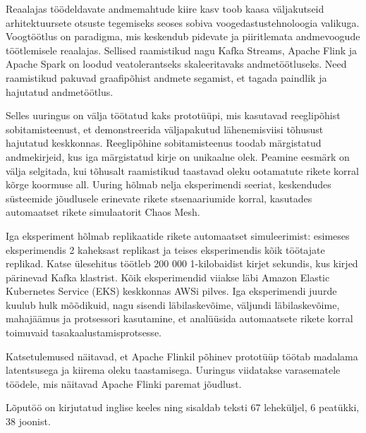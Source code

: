 Reaalajas töödeldavate andmemahtude kiire kasv toob kaasa
väljakutseid arhitektuursete otsuste tegemiseks seoses sobiva voogedastustehnoloogia valikuga.
Voogtöötlus on paradigma, mis keskendub pidevate ja piiritlemata andmevoogude töötlemisele reaalajas.
Sellised raamistikud nagu Kafka Streams, Apache Flink ja Apache Spark on loodud veatolerantseks skaleeritavaks andmetöötluseks.
Need raamistikud pakuvad graafipõhist andmete segamist, et tagada paindlik ja hajutatud andmetöötlus.

Selles uuringus on välja töötatud kaks prototüüpi, mis kasutavad reeglipõhist sobitamisteenust,
et demonstreerida väljapakutud lähenemisviisi tõhusust hajutatud keskkonnas.
Reeglipõhine sobitamisteenus toodab märgistatud andmekirjeid, kus iga märgistatud kirje on unikaalne olek.
Peamine eesmärk on välja selgitada, kui tõhusalt raamistikud taastavad oleku ootamatute rikete korral kõrge koormuse all.
Uuring hõlmab nelja eksperimendi seeriat, keskendudes süsteemide jõudlusele erinevate rikete stsenaariumide korral,
kasutades automaatset rikete simulaatorit Chaos Mesh.

Iga eksperiment hõlmab replikaatide rikete automaatset simuleerimist: esimeses eksperimendis 2 kaheksast replikast ja teises eksperimendis kõik töötajate replikad.
Katse ülesehitus töötleb 200 000 1-kilobaidist kirjet sekundis, kus kirjed pärinevad Kafka klastrist.
Kõik eksperimendid viiakse läbi Amazon Elastic Kubernetes Service (EKS) keskkonnas AWSi
pilves. Iga eksperimendi juurde kuulub hulk mõõdikuid, nagu sisendi läbilaskevõime,
väljundi läbilaskevõime, mahajäämus ja protsessori kasutamine, et analüüsida automaatsete
rikete korral toimuvaid tasakaalustamisprotsesse.

Katsetulemused näitavad, et Apache Flinkil põhinev prototüüp töötab madalama latentsusega ja kiirema oleku taastamisega.
Uuringus viidatakse varasematele töödele, mis näitavad Apache Flinki paremat jõudlust.

Lõputöö on kirjutatud inglise keeles ning sisaldab teksti 67 leheküljel, 6 peatükki, 38 joonist.